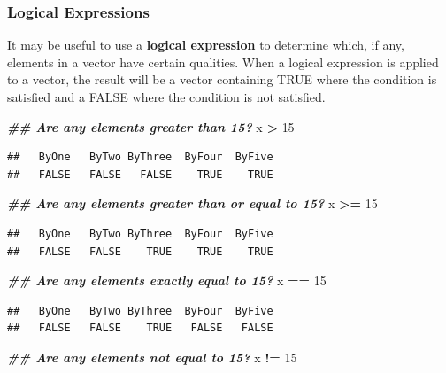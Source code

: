 \documentclass[
]{book}
\newenvironment{Shaded}{\begin{snugshade}}{\end{snugshade}}
\newcommand{\DecValTok}[1]{\textcolor[rgb]{0.00,0.00,0.81}{#1}}
\newcommand{\DocumentationTok}[1]{\textcolor[rgb]{0.56,0.35,0.01}{\textbf{\textit{#1}}}}
\newcommand{\NormalTok}[1]{#1}
\newcommand{\SpecialCharTok}[1]{\textcolor[rgb]{0.81,0.36,0.00}{\textbf{#1}}}
\theoremstyle{definition}
\theoremstyle{definition}
\theoremstyle{definition}
\theoremstyle{definition}
\theoremstyle{remark}
\begin{document}
\hypertarget{logicalexp}{%
\subsubsection{Logical Expressions}\label{logicalexp}}

It may be useful to use a \textbf{logical expression} to determine which, if any, elements in a vector have certain qualities. When a logical expression is applied to a vector, the result will be a vector containing TRUE where the condition is satisfied and a FALSE where the condition is not satisfied.

\begin{Shaded}
\begin{Highlighting}[]
\DocumentationTok{\#\# Are any elements greater than 15?}
\NormalTok{x }\SpecialCharTok{\textgreater{}} \DecValTok{15}
\end{Highlighting}
\end{Shaded}

\begin{verbatim}
##   ByOne   ByTwo ByThree  ByFour  ByFive 
##   FALSE   FALSE   FALSE    TRUE    TRUE
\end{verbatim}

\begin{Shaded}
\begin{Highlighting}[]
\DocumentationTok{\#\# Are any elements greater than or equal to 15?}
\NormalTok{x }\SpecialCharTok{\textgreater{}=} \DecValTok{15}
\end{Highlighting}
\end{Shaded}

\begin{verbatim}
##   ByOne   ByTwo ByThree  ByFour  ByFive 
##   FALSE   FALSE    TRUE    TRUE    TRUE
\end{verbatim}

\begin{Shaded}
\begin{Highlighting}[]
\DocumentationTok{\#\# Are any elements exactly equal to 15?}
\NormalTok{x }\SpecialCharTok{==} \DecValTok{15}
\end{Highlighting}
\end{Shaded}

\begin{verbatim}
##   ByOne   ByTwo ByThree  ByFour  ByFive 
##   FALSE   FALSE    TRUE   FALSE   FALSE
\end{verbatim}

\begin{Shaded}
\begin{Highlighting}[]
\DocumentationTok{\#\# Are any elements not equal to 15?}
\NormalTok{x }\SpecialCharTok{!=} \DecValTok{15}
\end{Highlighting}
\end{Shaded}
\end{document}
